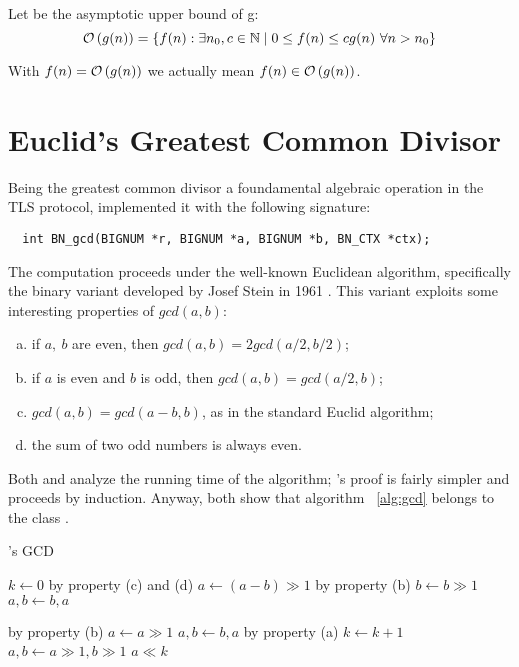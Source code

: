 Let  be the asymptotic upper bound of g:
$$
\mathcal{O}\left(g(n)\right) = \{ f(n) : \exists n_0, c \in \mathbb{N} \mid 0 \leq f(n) \leq cg(n)
\ \forall n > n_0 \}
$$

With $f(n) = \mathcal{O}\left(g(n)\right)$ we actually mean
$f(n) \in \mathcal{O}\left(g(n)\right)$.

\section{Euclid's Greatest Common Divisor \label{sec:preq:gcd}}

Being the greatest common divisor a foundamental algebraic operation in the TLS
protocol, \openssl implemented it with the following signature:

\begin{verbatim}
  int BN_gcd(BIGNUM *r, BIGNUM *a, BIGNUM *b, BN_CTX *ctx);
\end{verbatim}

The computation proceeds under the well-known Euclidean algorithm, specifically
the binary variant developed by Josef Stein in 1961 \cite{AOCPv2}. This variant
exploits some interesting properties of $gcd(a, b)$:
\begin{enumerate}[(a)]
  \setlength{\itemsep}{1pt}
  \item if $a,\ b$ are even, then $gcd(a, b) = 2gcd(a/2, b/2)$;
  \item if $a$ is even and $b$ is odd, then $gcd(a, b) = gcd(a/2, b)$;
  \item  $gcd(a, b) = gcd(a-b, b)$, as in the standard Euclid algorithm;
  \item the sum of two odd numbers is always even.
\end{enumerate}

Both \cite{AOCPv2} and \cite{MITalg} analyze the running time of the
algorithm; \cite{MITalg}'s proof is fairly simpler and proceeds %
by induction.
Anyway, both show that algorithm ~\ref{alg:gcd} belongs to the class
.

\begin{algorithm}[H]
  \caption{\openssl's GCD \label{alg:gcd}}
  \begin{algorithmic}[1]
    \State $k \gets 0$
          \Comment by property (c) and (d)
          \State $a \gets (a-b) \gg 1$
        \Else
          \Comment by property (b)
          \State $b \gets b \gg 1$
        \EndIf
         $a, b \gets b, a$ \EndIf

      \Else
        \Comment by property (b)
          \State $a \gets a \gg 1$
           $a, b \gets b, a$ \EndIf
        \Else
        \Comment by property (a)
          \State $k \gets k+1$
          \State $a, b \gets a \gg 1, b \gg 1$
        \EndIf
      \EndIf
    \EndWhile
    \State \Return $a \ll k$

  \end{algorithmic}
\end{algorithm}

